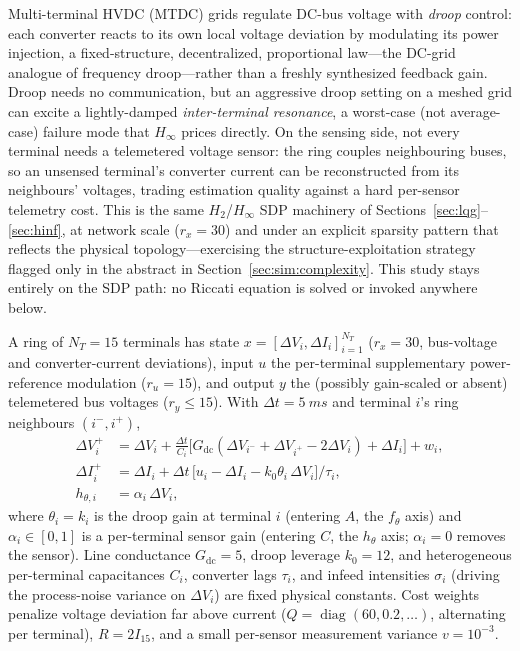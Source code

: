 \documentclass[twocolumn,amsthm]{autart}
\begin{document}
Multi-terminal HVDC (MTDC) grids regulate DC-bus voltage with \emph{droop}
control: each converter reacts to its own local voltage deviation by
modulating its power injection, a fixed-structure, decentralized, proportional
law---the DC-grid analogue of frequency droop---rather than a freshly
synthesized feedback gain. Droop needs no communication, but an aggressive
droop setting on a meshed grid can excite a lightly-damped
\emph{inter-terminal resonance}, a worst-case (not average-case) failure mode
that $H_\infty$ prices directly. On the sensing side, not every terminal needs
a telemetered voltage sensor: the ring couples neighbouring buses, so an
unsensed terminal's converter current can be reconstructed from its
neighbours' voltages, trading estimation quality against a hard per-sensor
telemetry cost. This is the same $H_2$/$H_\infty$ SDP machinery of
Sections~\ref{sec:lqg}--\ref{sec:hinf}, at network scale ($r_x=30$) and under
an explicit sparsity pattern that reflects the physical topology---exercising
the structure-exploitation strategy flagged only in the abstract in
Section~\ref{sec:sim:complexity}. This study stays entirely on the SDP path:
no Riccati equation is solved or invoked anywhere below.

A ring of $N_T=15$ terminals has state $x=[\Delta V_i,\Delta I_i]_{i=1}^{N_T}$
($r_x=30$, bus-voltage and converter-current deviations), input $u$ the
per-terminal supplementary power-reference modulation ($r_u=15$), and output
$y$ the (possibly gain-scaled or absent) telemetered bus voltages
($r_y\le15$). With $\Delta t=\SI{5}{ms}$ and terminal $i$'s ring neighbours
$(i^-,i^+)$,
\begin{subequations}\label{eq:mtdc-model}
\begin{align}
\Delta V_i^+ &= \Delta V_i + \tfrac{\Delta t}{C_i}\big[G_{\mathrm{dc}}(\Delta V_{i^-}\!+\!\Delta V_{i^+}\!-\!2\Delta V_i) + \Delta I_i\big] + w_i,\\
\Delta I_i^+ &= \Delta I_i + \Delta t\,\big[u_i - \Delta I_i - k_0\theta_i\,\Delta V_i\big]/\tau_i,\\
h_{\theta,i} &= \alpha_i\,\Delta V_i,
\end{align}
\end{subequations}
where $\theta_i=k_i$ is the droop gain at terminal $i$ (entering $A$, the
$f_\theta$ axis) and $\alpha_i\in[0,1]$ is a per-terminal sensor gain
(entering $C$, the $h_\theta$ axis; $\alpha_i=0$ removes the sensor). Line
conductance $G_{\mathrm{dc}}=5$, droop leverage $k_0=12$, and heterogeneous
per-terminal capacitances $C_i$, converter lags $\tau_i$, and infeed
intensities $\sigma_i$ (driving the process-noise variance on $\Delta V_i$) are
fixed physical constants. Cost weights penalize voltage deviation far above
current ($Q=\operatorname{diag}(60,0.2,\dots)$, alternating per terminal),
$R=2I_{15}$, and a small per-sensor measurement variance $v=10^{-3}$.
\end{document}
